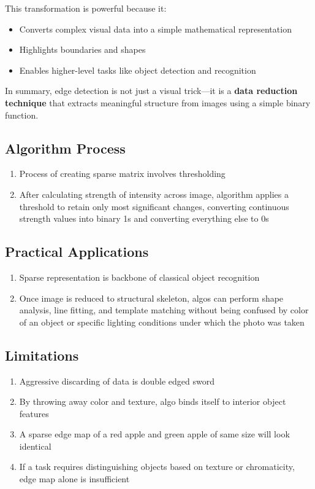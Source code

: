 \documentclass[12pt]{article}
\begin{document}
This transformation is powerful because it:
\begin{itemize}
    \item Converts complex visual data into a simple mathematical representation
    \item Highlights boundaries and shapes
    \item Enables higher-level tasks like object detection and recognition
\end{itemize}

In summary, edge detection is not just a visual trick—it is a \textbf{data reduction technique} that extracts meaningful structure from images using a simple binary function.

\subsection{Algorithm Process}
\begin{enumerate}
    \item Process of creating sparse matrix involves thresholding
    \item After calculating strength of intensity across image, algorithm applies a threshold to retain only most significant changes, converting continuous strength values into binary 1s and converting everything else to 0s
\end{enumerate}

\subsection{Practical Applications}
\begin{enumerate}
    \item Sparse representation is backbone of classical object recognition
    \item Once image is reduced to structural skeleton, algos can perform shape analysis, line fitting, and template matching without being confused by color of an object or specific lighting conditions under which the photo was taken
\end{enumerate}

\subsection{Limitations}
\begin{enumerate}
    \item Aggressive discarding of data is double edged sword
    \item By throwing away color and texture, algo binds itself to interior object features
    \item A sparse edge map of a red apple and green apple of same size will look identical
    \item If a task requires distinguishing objects based on texture or chromaticity, edge map alone is insufficient
\end{enumerate}
\end{document}
